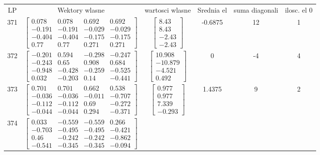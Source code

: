 \documentclass[a4paper,12pt]{article}
\begin{document}
\bgroup {} \vspace{0.2in} \begin{tabular}{c c c c c c}
LP &Wektory wlasne & wartosci wlasne & Srednia el & suma diagonali & ilosc. el 0\\
371
&
$\begin{bmatrix} 0.078 & 0.078 & 0.692 & 0.692 \\ -0.191 & -0.191 & -0.029 & -0.029 \\ -0.404 & -0.404 & -0.175 & -0.175 \\ 0.77 & 0.77 & 0.271 & 0.271 \end{bmatrix}$
&
$\begin{bmatrix} 8.43 \\ 8.43 \\ -2.43 \\ -2.43 \end{bmatrix}$
&
-0.6875
&
12
&
1
\\
372
&
$\begin{bmatrix} -0.201 & 0.594 & -0.298 & -0.247 \\ -0.243 & 0.65 & 0.908 & 0.684 \\ -0.948 & -0.428 & -0.259 & -0.525 \\ 0.032 & -0.203 & 0.14 & -0.441 \end{bmatrix}$
&
$\begin{bmatrix} 10.908 \\ -10.879 \\ -4.521 \\ 0.492 \end{bmatrix}$
&
0
&
-4
&
4
\\
373
&
$\begin{bmatrix} 0.701 & 0.701 & 0.662 & 0.538 \\ -0.036 & -0.036 & -0.011 & -0.707 \\ -0.112 & -0.112 & 0.69 & -0.272 \\ -0.044 & -0.044 & 0.294 & -0.371 \end{bmatrix}$
&
$\begin{bmatrix} 0.977 \\ 0.977 \\ 7.339 \\ -0.293 \end{bmatrix}$
&
1.4375
&
9
&
2
\\
374
&
$\begin{bmatrix} 0.033 & -0.559 & -0.559 & 0.266 \\ -0.703 & -0.495 & -0.495 & -0.421 \\ 0.46 & -0.242 & -0.242 & -0.862 \\ -0.541 & -0.345 & -0.345 & -0.094 \end{bmatrix}$

\end{tabular}
\end{document}
